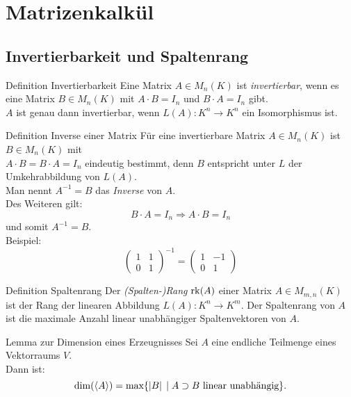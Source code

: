 \documentclass[main.tex]{subfiles}
\begin{document}
\section*{Matrizenkalkül}
\subsection*{Invertierbarkeit und Spaltenrang}

\begin{karte}{Definition Invertierbarkeit}
    Eine Matrix \(A \in M_n(K)\) ist \textit{invertierbar},
    wenn es eine Matrix \(B \in M_n(K)\) mit \(A \cdot B = I_n\) 
    und \(B \cdot A = I_n\) gibt.\\
    \(A\) ist genau dann invertierbar, wenn \(L(A): K^n \rightarrow K^n \)
    ein Isomorphismus ist.
\end{karte}
\begin{karte}{Definition Inverse einer Matrix}
    Für eine invertierbare Matrix \(A \in M_n(K)\) ist \(B \in M_n(K)\) 
    mit \\
     \(A \cdot B = B \cdot A = I_n\)
    eindeutig bestimmt, denn \(B\) entspricht unter \(L\) 
    der Umkehrabbildung von \(L(A)\). \\
    Man nennt \(A^{-1} = B\) das \textit{Inverse} von \(A\).\\
    Des Weiteren gilt: 
    \[B \cdot A = I_n \Rightarrow A \cdot B = I_n\] 
    und somit \(A^{-1} = B\).\\
    Beispiel: 
    \[ \begin{pmatrix}
        1 & 1 \\
        0 & 1
    \end{pmatrix}^{-1} = 
    \begin{pmatrix}
        1 & -1 \\
        0 & 1
    \end{pmatrix} \]
\end{karte}
\begin{karte}{Definition Spaltenrang}
    Der \textit{(Spalten-)Rang} \(\operatorname{rk}(A)\) einer Matrix
    \(A \in M_{m,n}(K)\) ist der Rang der linearen Abbildung 
    \(L(A): K^n \rightarrow K^m\).
    Der Spaltenrang von \(A\) ist die maximale Anzahl linear unabhängiger 
    Spaltenvektoren von \(A\).
\end{karte}
\begin{karte}{Lemma zur Dimension eines Erzeugnisses}
    Sei \(A\) eine endliche Teilmenge eines Vektorraums \(V\). \\
    Dann ist: 
    \[\dim(\langle A \rangle) = \text{max}\{\left| B \right| \;\vert \; 
    A \supset B \text{ linear unabhängig}\}.\]
\end{karte}
\end{document}
